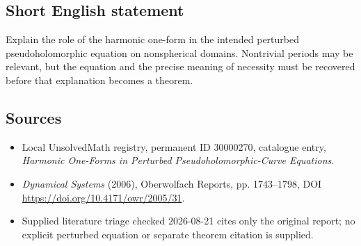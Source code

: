 \documentclass[11pt]{article}
\begin{document}
\subsection{Short English statement}
Explain the role of the harmonic one-form in the intended perturbed pseudoholomorphic equation on nonspherical domains. Nontrivial periods may be relevant, but the equation and the precise meaning of necessity must be recovered before that explanation becomes a theorem.
\subsection{Sources}
\begin{itemize}
\item Local UnsolvedMath registry, permanent ID 30000270, catalogue entry, \emph{Harmonic One-Forms in Perturbed Pseudoholomorphic-Curve Equations}.
\item \emph{Dynamical Systems} (2006), Oberwolfach Reports, pp. 1743--1798, DOI \url{https://doi.org/10.4171/owr/2005/31}.
\item Supplied literature triage checked 2026-08-21 cites only the original report; no explicit perturbed equation or separate theorem citation is supplied.
\end{itemize}
\end{document}
